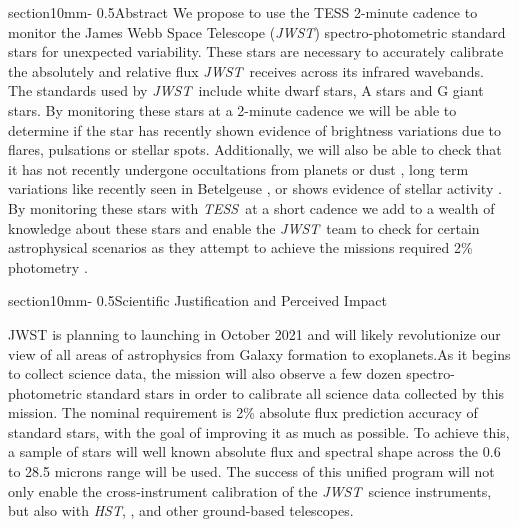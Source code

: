 \documentclass[letterpaper,12pt]{article}
\makeatletter
\renewcommand{\section}{\@startsection%
{section}{1}{0mm}{-\baselineskip}%
{0.5\baselineskip}{\normalfont\Large\bfseries}}%
\newcommand{\tess}{{\it TESS}}
\newcommand{\jwst}{{\it JWST}}
\newcommand{\hst}{{\it HST}}
\newcommand{\swift}{{\it Swift}}
\newcommand{\fermi}{{\it Fermi}}
\makeatother
\begin{document}



\section{Abstract}
We propose to use the TESS 2-minute cadence to monitor the James Webb Space Telescope (\jwst) spectro-photometric standard stars for unexpected variability. These stars are necessary to accurately calibrate the absolutely and relative flux \jwst\ receives across its infrared wavebands. The standards used by \jwst\ include white dwarf stars, A stars and G giant stars. By monitoring these stars at a 2-minute cadence we will be able to determine if the star has recently shown evidence of brightness variations due to flares, pulsations or stellar spots. Additionally, we will also be able to check that it has not recently undergone occultations from planets or dust \citep[][]{Boyajian2016}, long term variations like recently seen in Betelgeuse \citep{Guinan2019}, or shows evidence of stellar activity \citep{Kohler2017nova}. By monitoring these stars with \tess\ at a short cadence we add to a wealth of knowledge about these stars and enable the \jwst\ team to check for certain astrophysical scenarios as they attempt to achieve the missions required 2\% photometry \citep{jdox}.


\section{Scientific Justification and Perceived Impact}

JWST is planning to launching in October 2021 and will likely revolutionize our view of all areas of astrophysics from Galaxy formation to exoplanets.As it begins to collect science data, the mission will also observe a few dozen spectro-photometric standard stars in order to calibrate all science data collected by this mission. The nominal requirement is 2\% absolute flux prediction accuracy of standard stars, with the goal of improving it as much as possible.  To achieve this, a sample of stars will well known absolute flux and spectral shape across the 0.6 to 28.5 microns range will be used. The success of this unified program will not only enable the cross-instrument calibration of the \jwst\ science instruments, but also with \hst, \spitzer, and other ground-based telescopes.
\end{document}
